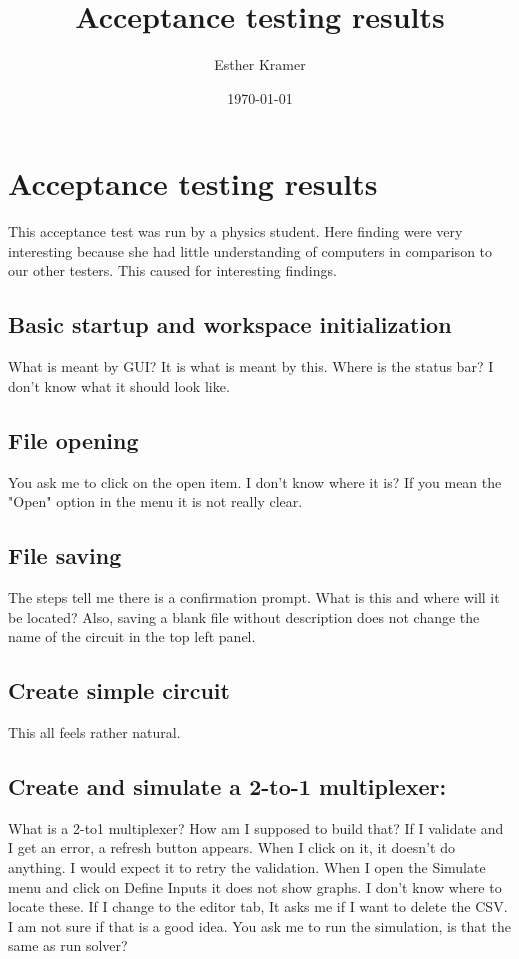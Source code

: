 \documentclass[a4paper]{article}
\newcounter{step}
\begin{document}
\title{Acceptance testing results}
\author{Esther Kramer}
\date{\today}
\maketitle



\section{Acceptance testing results}
This acceptance test was run by a physics student. Here finding were very interesting because she had little understanding of computers in comparison to our other testers. This caused for interesting findings.

\subsection{Basic startup and workspace initialization}
What is meant by GUI? It is what is meant by this.
Where is the status bar? I don't know what it should look like.

\subsection{File opening}
You ask me to click on the open item. I don't know where it is? If you mean the "Open" option in the menu it is not really clear. 

\subsection{File saving}
The steps tell me there is a confirmation prompt. What is this and where will it be located?
Also, saving a blank file without description does not change the name of the circuit in the top left panel.

\subsection{Create simple circuit}
This all feels rather natural.

\subsection{Create and simulate a 2-to-1 multiplexer:}
What is a 2-to1 multiplexer? How am I supposed to build that?
If I validate and I get an error, a refresh button appears. When I click on it, it doesn't do anything. I would expect it to retry the validation.
When I open the Simulate menu and click on Define Inputs it does not show graphs. I don't know where to locate these.
If I change to the editor tab, It asks me if I want to delete the CSV. I am not sure if that is a good idea.
You ask me to run the simulation, is that the same as run solver?
\end{document}
